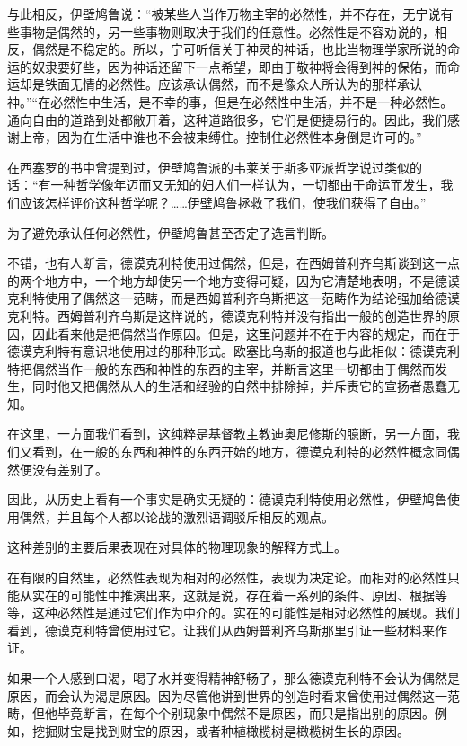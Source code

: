 \documentclass[a4paper,twoside,12pt,AutoFakeBold]{ctexart}
\begin{document}
与此相反，伊壁鸠鲁说：“被某些人当作万物主宰的必然性，并不存在，无宁说有些事物是偶然的，另一些事物则取决于我们的任意性。必然性是不容劝说的，相反，偶然是不稳定的。所以，宁可听信关于神灵的神话，也比当物理学家所说的命运的奴隶要好些，因为神话还留下一点希望，即由于敬神将会得到神的保佑，而命运却是铁面无情的必然性。应该承认偶然，而不是像众人所认为的那样承认神。”“在必然性中生活，是不幸的事，但是在必然性中生活，并不是一种必然性。通向自由的道路到处都敞开着，这种道路很多，它们是便捷易行的。因此，我们感谢上帝，因为在生活中谁也不会被束缚住。控制住必然性本身倒是许可的。”

在西塞罗的书中曾提到过，伊壁鸠鲁派的韦莱关于斯多亚派哲学说过类似的话：“有一种哲学像年迈而又无知的妇人们一样认为，一切都由于命运而发生，我们应该怎样评价这种哲学呢？……伊壁鸠鲁拯救了我们，使我们获得了自由。”

为了避免承认任何必然性，伊壁鸠鲁甚至否定了选言判断。

不错，也有人断言，德谟克利特使用过偶然，但是，在西姆普利齐乌斯谈到这一点的两个地方中，一个地方却使另一个地方变得可疑，因为它清楚地表明，不是德谟克利特使用了偶然这一范畴，而是西姆普利齐乌斯把这一范畴作为结论强加给德谟克利特。西姆普利齐乌斯是这样说的，德谟克利特并没有指出一般的创造世界的原因，因此看来他是把偶然当作原因。但是，这里问题并不在于内容的规定，而在于德谟克利特有意识地使用过的那种形式。欧塞比乌斯的报道也与此相似：德谟克利特把偶然当作一般的东西和神性的东西的主宰，并断言这里一切都由于偶然而发生，同时他又把偶然从人的生活和经验的自然中排除掉，并斥责它的宣扬者愚蠢无知。

在这里，一方面我们看到，这纯粹是基督教主教迪奥尼修斯的臆断，另一方面，我们又看到，在一般的东西和神性的东西开始的地方，德谟克利特的必然性概念同偶然便没有差别了。

因此，从历史上看有一个事实是确实无疑的：德谟克利特使用必然性，伊壁鸠鲁使用偶然，并且每个人都以论战的激烈语调驳斥相反的观点。

这种差别的主要后果表现在对具体的物理现象的解释方式上。

在有限的自然里，必然性表现为相对的必然性，表现为决定论。而相对的必然性只能从实在的可能性中推演出来，这就是说，存在着一系列的条件、原因、根据等等，这种必然性是通过它们作为中介的。实在的可能性是相对必然性的展现。我们看到，德谟克利特曾使用过它。让我们从西姆普利齐乌斯那里引证一些材料来作证。

如果一个人感到口渴，喝了水并变得精神舒畅了，那么德谟克利特不会认为偶然是原因，而会认为渴是原因。因为尽管他讲到世界的创造时看来曾使用过偶然这一范畴，但他毕竟断言，在每个个别现象中偶然不是原因，而只是指出别的原因。例如，挖掘财宝是找到财宝的原因，或者种植橄榄树是橄榄树生长的原因。
\end{document}
